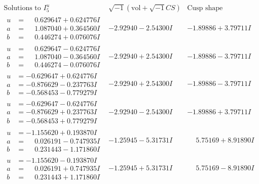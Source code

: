 \documentclass[1p]{elsarticle_modified}
\theoremstyle{definition}
\newcommand{\I}{\sqrt{-1}}
\begin{document}
$$\begin{array}{c|c|c}  
\text{Solutions to }I^u_{5}& \I (\text{vol} + \sqrt{-1}CS) & \text{Cusp shape}\\
 \hline 
\begin{aligned}
u &= \phantom{-}0.629647 + 0.624776 I \\
a &= \phantom{-}1.087040 + 0.364560 I \\
b &= \phantom{-}0.446274 + 0.076076 I\end{aligned}
 & -2.92940 - 2.54300 I & -1.89886 + 3.79711 I \\ \hline\begin{aligned}
u &= \phantom{-}0.629647 - 0.624776 I \\
a &= \phantom{-}1.087040 - 0.364560 I \\
b &= \phantom{-}0.446274 - 0.076076 I\end{aligned}
 & -2.92940 + 2.54300 I & -1.89886 - 3.79711 I \\ \hline\begin{aligned}
u &= -0.629647 + 0.624776 I \\
a &= -0.876629 - 0.237763 I \\
b &= -0.568453 - 0.779279 I\end{aligned}
 & -2.92940 + 2.54300 I & -1.89886 - 3.79711 I \\ \hline\begin{aligned}
u &= -0.629647 - 0.624776 I \\
a &= -0.876629 + 0.237763 I \\
b &= -0.568453 + 0.779279 I\end{aligned}
 & -2.92940 - 2.54300 I & -1.89886 + 3.79711 I \\ \hline\begin{aligned}
u &= -1.155620 + 0.193870 I \\
a &= \phantom{-}0.026191 - 0.747935 I \\
b &= \phantom{-}0.231443 - 1.171860 I\end{aligned}
 & -1.25945 - 5.31731 I & \phantom{-}5.75169 + 8.91890 I \\ \hline\begin{aligned}
u &= -1.155620 - 0.193870 I \\
a &= \phantom{-}0.026191 + 0.747935 I \\
b &= \phantom{-}0.231443 + 1.171860 I\end{aligned}
 & -1.25945 + 5.31731 I & \phantom{-}5.75169 - 8.91890 I \\ \hline\begin{aligned}

\end{aligned}
\end{array}$$
\end{document}
